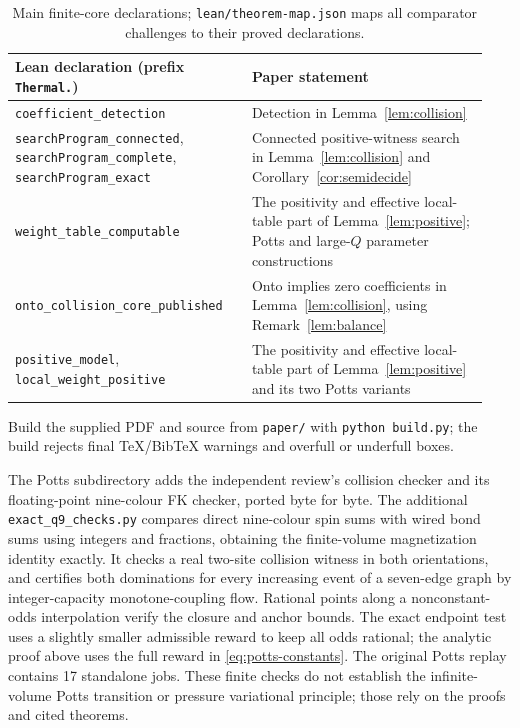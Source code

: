 \begin{table}[htbp]
\centering\small
\begin{tabular}{@{}>{\raggedright\arraybackslash}p{0.47\linewidth}>{\raggedright\arraybackslash}p{0.47\linewidth}@{}}
\toprule
Lean declaration (prefix \texttt{Thermal.}) & Paper statement \\
\midrule
\texttt{coefficient\_detection} & Detection in Lemma~\ref{lem:collision} \\
\texttt{searchProgram\_\allowbreak connected}, \texttt{searchProgram\_\allowbreak complete}, \texttt{searchProgram\_\allowbreak exact} & Connected positive-witness search in Lemma~\ref{lem:collision} and Corollary~\ref{cor:semidecide} \\
\texttt{weight\_table\_computable} & The positivity and effective local-table part of Lemma~\ref{lem:positive}; Potts and large-$Q$ parameter constructions \\
\texttt{onto\_collision\_core\_published} & Onto implies zero coefficients in Lemma~\ref{lem:collision}, using Remark~\ref{lem:balance} \\
\texttt{positive\_model}, \texttt{local\_weight\_positive} & The positivity and effective local-table part of Lemma~\ref{lem:positive} and its two Potts variants \\
\bottomrule
\end{tabular}
\caption{Main finite-core declarations; \texttt{lean/theorem-map.json} maps all comparator challenges to their proved declarations.}
\label{tab:lean-map}
\end{table}

Build the supplied PDF and source from \texttt{paper/} with \texttt{python build.py}; the build rejects final TeX/BibTeX warnings and overfull or underfull boxes.

The Potts subdirectory adds the independent review's collision checker and its floating-point nine-colour FK checker, ported byte for byte. The additional \texttt{exact\_q9\_checks.py} compares direct nine-colour spin sums with wired bond sums using integers and fractions, obtaining the finite-volume magnetization identity exactly. It checks a real two-site collision witness in both orientations, and certifies both dominations for every increasing event of a seven-edge graph by integer-capacity monotone-coupling flow. Rational points along a nonconstant-odds interpolation verify the closure and anchor bounds. The exact endpoint test uses a slightly smaller admissible reward to keep all odds rational; the analytic proof above uses the full reward in \eqref{eq:potts-constants}. The original Potts replay contains 17 standalone jobs. These finite checks do not establish the infinite-volume Potts transition or pressure variational principle; those rely on the proofs and cited theorems.


